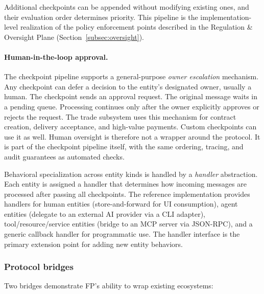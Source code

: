 \documentclass{llmxive}
\begin{document}
\noindent Additional checkpoints can be appended without modifying
existing ones, and their evaluation order determines priority.  This
pipeline is the implementation-level realization of the policy
enforcement points described in the Regulation \& Oversight Plane
(Section~\ref{subsec:oversight}).

\paragraph{Human-in-the-loop approval.}
The checkpoint pipeline supports a general-purpose \emph{owner
escalation} mechanism. Any checkpoint can defer a decision to the entity's designated owner, usually a human. The checkpoint sends an approval request. The original message waits in a pending queue. Processing continues only after the owner explicitly approves or rejects the request.
The trade subsystem uses this mechanism for contract creation, delivery acceptance, and high-value payments. Custom checkpoints can use it as well. Human oversight is therefore not a wrapper around the protocol. It is part of the checkpoint pipeline itself, with the same ordering, tracing, and audit guarantees as automated checks.

Behavioral specialization across entity kinds is handled by a
\emph{handler} abstraction.  Each entity is assigned a handler that
determines how incoming messages are processed after passing all
checkpoints.  The reference implementation provides handlers for human
entities (store-and-forward for UI consumption), agent entities (delegate
to an external AI provider via a CLI adapter), tool/resource/service
entities (bridge to an MCP server via JSON-RPC), and a generic callback
handler for programmatic use. The handler interface is the primary
extension point for adding new entity behaviors.

\subsubsection{Protocol bridges}

Two bridges demonstrate FP's ability to wrap existing ecosystems:
\end{document}
